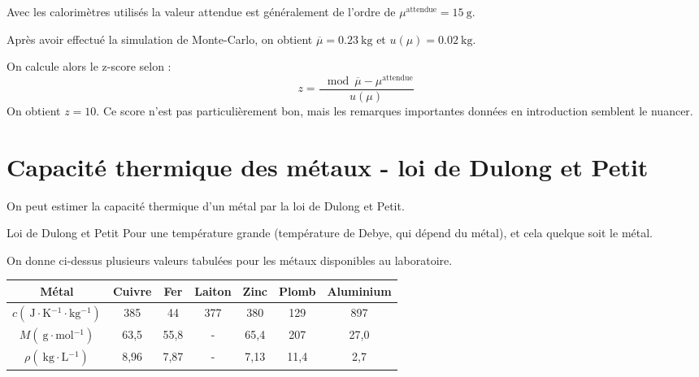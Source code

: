 \documentclass[a4paper,french,bookmarks]{article}
\begin{document}
Avec les calorimètres utilisés la valeur attendue est généralement de l'ordre de $\mu^\text{attendue} = \SI{15}{\g}$.

\noafter
%
%
\nobefore\yesafter
%
\begin{expcom} \text{}
    \begin{enumerate}
        \itt Après avoir effectué la simulation de Monte-Carlo, on obtient $\overline{\mu} = \SI{0.23}{\kg}$ et $u\left(\mu\right) = \SI{0.02}{\kg}$.
        
        \itt On calcule alors le z-score selon :
        \[ z = \dfrac{\mod{\overline{\mu} - \mu^\text{attendue}}}{u\left(\mu\right)}\]
        On obtient $z = 10$. Ce score n'est pas particulièrement bon, mais les remarques importantes données en introduction semblent le nuancer.
    \end{enumerate}
\end{expcom}
%
\yesbefore

\section{Capacité thermique des métaux - loi de Dulong et Petit}

On peut estimer la capacité thermique d'un métal par la loi de Dulong et Petit.

\begin{property*}{Loi de Dulong et Petit}{}
    Pour une température  grande (température de Debye, qui dépend du métal),  et cela quelque soit le métal.
\end{property*}

On donne ci-dessus plusieurs valeurs tabulées pour les métaux disponibles au laboratoire.

\begin{center}
    	\begin{tabular}{c||c|c|c|c|c|c}
		Métal 				& Cuivre & Fer & Laiton & Zinc & Plomb & Aluminium	\\ \hline\hline
		$c \left(\SI{}{\joule \cdot \kelvin^{-1} \cdot \kg^{-1}}\right)$ 	& 385 & 44 & 377 & 380 & 129 & 897 \\
		$M \left(\SI{}{\g \cdot \mol^{-1}}\right)$ & 63,5 & 55,8 & - & 65,4 & 207 & 27,0 \\
		$\rho \left(\SI{}{\kg \cdot \L^{-1}}\right)$ & 8,96 & 7,87 & - & 7,13 & 11,4 & 2,7
	\end{tabular}
\end{center}
\end{document}
